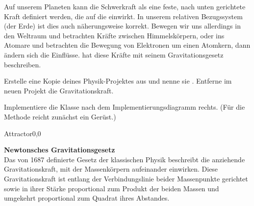 \documentclass[9pt, a4paper, ngerman]{arbeitsblatt}
\begin{document}
\newpage
\begin{aufgabe}[subtitle=Flug der Atome,icon=\iconComputer]
\label{aufg:atome}
\begin{links}[.6]
	Auf unserem Planeten kann die Schwerkraft als eine feste, nach unten gerichtete Kraft definiert werden, die auf die  einwirkt. In unserem relativen Bezugssystem (der Erde) ist dies auch näherungsweise korrekt. Bewegen wir uns allerdings in den Weltraum und betrachten Kräfte zwischen Himmelskörpern, oder ins Atomare und betrachten die Bewegung von Elektronen um einen Atomkern, dann ändern sich die Einflüsse.  hat diese Kräfte mit seinem Gravitationsgesetz beschreiben.

	\begin{enuma}
		\item Erstelle eine Kopie deines Physik-Projektes aus  und nenne sie . Entferne im neuen Projekt die Gravitationskraft.
		\item Implementiere die Klasse  nach dem Implementierungsdiagramm rechts. (Für die Methode  reicht zunächst ein Gerüst.)
	\end{enuma}
\end{links}\begin{rechts}[.4]\centering
	\begin{klassendiagramm}%
		\begin{class}[text width=6cm]{Attractor}{0,0}

		\end{class}
	\end{klassendiagramm}
\end{rechts}

\begin{infobox}
	\begin{links}[.6]
	\textbf{Newtonsches Gravitationsgesetz} \\
	Das von  1687 definierte Gesetz der klassischen Physik beschreibt die anziehende Gravitationskraft, mit der Massenkörpern aufeinander einwirken. Diese Gravitationskraft ist entlang der Verbindungslinie beider Massenpunkte gerichtet sowie in ihrer Stärke proportional zum Produkt der beiden Massen und umgekehrt proportional zum Quadrat ihres Abstandes.


\end{links}
\end{infobox}
\end{aufgabe}
\end{document}
